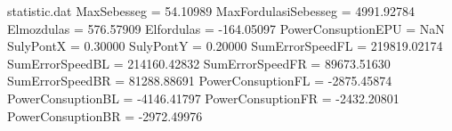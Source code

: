 \begin{filecontents*}{statistic.dat}
MaxSebesseg =   54.10989
MaxFordulasiSebesseg = 4991.92784
Elmozdulas =  576.57909
Elfordulas = -164.05097
PowerConsuptionEPU =        NaN
SulyPontX =    0.30000
SulyPontY =    0.20000
SumErrorSpeedFL = 219819.02174
SumErrorSpeedBL = 214160.42832
SumErrorSpeedFR = 89673.51630
SumErrorSpeedBR = 81288.88691
PowerConsuptionFL = -2875.45874
PowerConsuptionBL = -4146.41797
PowerConsuptionFR = -2432.20801
PowerConsuptionBR = -2972.49976
\end{filecontents*}
